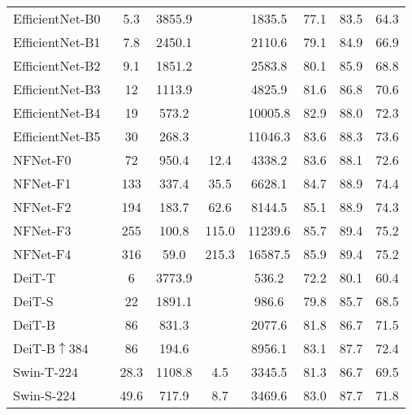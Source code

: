 \begin{table}[t]
{\begin{tabular}{lcccc|ccc}
    \midrule
    EfficientNet-B0~\cite{tan2019efficientnet} & 5.3  &3855.9  &   &  1835.5  &77.1 & 83.5 & 64.3 \\
    EfficientNet-B1~\cite{tan2019efficientnet} &7.8   & 2450.1 &   &  2110.6  & 79.1 & 84.9 & 66.9\\
    EfficientNet-B2~\cite{tan2019efficientnet} & 9.1   & 1851.2 &  & 2583.8   & 80.1 & 85.9 & 68.8 \\
	 EfficientNet-B3~\cite{tan2019efficientnet} & 12  & 1113.9 & \tzo1.8  &  4825.9  & 81.6 & 86.8 & 70.6\\
	 EfficientNet-B4~\cite{tan2019efficientnet} & 19  & 573.2 & \tzo4.2 &  10005.8  & 82.9 & 88.0 & 72.3\\
	 EfficientNet-B5~\cite{tan2019efficientnet} & 30  & 268.3 & \tzo9.9 &  11046.3  & 83.6 & 88.3 & 73.6\\
	 \midrule
	 NFNet-F0~\cite{Brock2021HighPerformanceLI} & 72 & 950.4 & 12.4 & 4338.2 & 83.6 & 88.1 & 72.6 \\
	 NFNet-F1~\cite{Brock2021HighPerformanceLI} & 133 & 337.4 & 35.5 & 6628.1 & 84.7 & 88.9 & 74.4\\
	 NFNet-F2~\cite{Brock2021HighPerformanceLI} & 194 & 183.7 & 62.6 & 8144.5 & 85.1 & 88.9 & 74.3\\
	 NFNet-F3~\cite{Brock2021HighPerformanceLI} & 255 & 100.8 & 115.0 & 11239.6 & 85.7 & 89.4 & 75.2 \\
	 NFNet-F4~\cite{Brock2021HighPerformanceLI} & 316 & 59.0 & 215.3 & 16587.5 & 85.9 & 89.4 & 75.2 \\

    \midrule
    DeiT-T~\cite{Touvron2020TrainingDI}   & 6  & 3773.9 &  &   536.2 & 72.2 & 80.1 & 60.4\\
    DeiT-S~\cite{Touvron2020TrainingDI}   & 22  & 1891.1 & \tzo4.6 & 986.6 & 79.8 & 85.7 & 68.5\\
	DeiT-B~\cite{Touvron2020TrainingDI}    & 86  & 831.3  & \dzo17.5 & 2077.6& 81.8 & 86.7 & 71.5\\
	
	DeiT-B$\uparrow 384$~\cite{Touvron2020TrainingDI}   & 86  & 194.6 &  & 8956.1  & 83.1 & 87.7 & 72.4 \\
	\midrule
	Swin-T-224~\cite{liu2021swin} & 28.3 & 1108.8 & 4.5 & 3345.5 & 81.3 & 86.7 & 69.5 \\
    Swin-S-224~\cite{liu2021swin} & 49.6 & 717.9 & 8.7 & 3469.6 &  83.0 & 87.7  &  71.8 \\


\end{tabular}}
\end{table}
